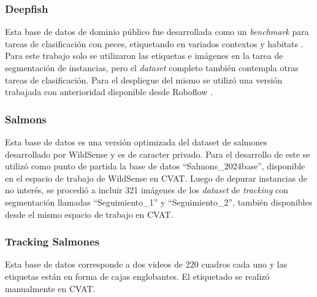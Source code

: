\subsubsection{Deepfish}
Esta base de datos de dominio público fue desarrollada como un \textit{benchmark} para tareas de clasificación con peces, etiquetando en variados contextos y habitats \cite{Deepfish}. Para este trabajo solo se utilizaron las etiquetas e imágenes en la tarea de segmentación de instancias, pero el \textit{dataset} completo también contempla otras tareas de clasificación. Para el despliegue del mismo se utilizó una versión trabajada con anterioridad disponible desde Roboflow \cite{DeepfishRoboflow}.

\subsubsection{Salmons}
Esta base de datos es una versión optimizada del dataset de salmones desarrollado por WildSense y es de caracter privado. Para el desarrollo de este se utilizó como punto de partida la base de datos ``Salmons_2024base'', disponible en el espacio de trabajo de WildSense en CVAT. Luego de depurar instancias de no interés, se procedió a incluir 321 imágenes de los \textit{dataset} de \textit{tracking} con segmentación llamadas ``Seguimiento_1'' y ``Seguimiento_2'', también disponibles desde el mismo espacio de trabajo en CVAT.

\subsubsection{Tracking Salmones}
Esta base de datos corresponde a dos videos de 220 cuadros cada uno y las etiquetas están en forma de cajas englobantes. El etiquetado se realizó manualmente en CVAT.
